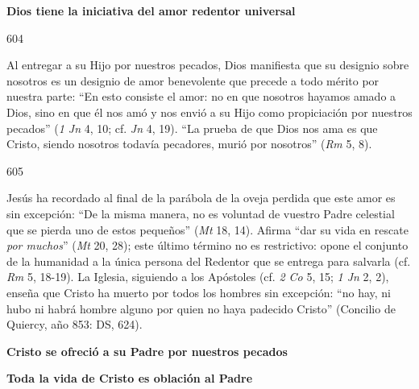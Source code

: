 			\begin{ccebody}\textbf{Dios tiene la iniciativa del amor redentor universal}\end{ccebody}
			
			\begin{ccebody}\begin{ccenumber}604\end{ccenumber} Al entregar a su Hijo por nuestros pecados, Dios manifiesta que su designio sobre nosotros es un designio de amor benevolente que precede a todo mérito por nuestra parte: “En esto consiste el amor: no en que nosotros hayamos amado a Dios, sino en que él nos amó y nos envió a su Hijo como propiciación por nuestros pecados” (\textit{1 Jn} 4, 10; cf. \textit{Jn} 4, 19). “La prueba de que Dios nos ama es que Cristo, siendo nosotros todavía pecadores, murió por nosotros” (\textit{Rm} 5, 8).\end{ccebody}
			
			\begin{ccebody}\begin{ccenumber}605\end{ccenumber} Jesús ha recordado al final de la parábola de la oveja perdida que este amor es sin excepción: “De la misma manera, no es voluntad de vuestro Padre celestial que se pierda uno de estos pequeños” (\textit{Mt} 18, 14). Afirma “dar su vida en rescate \textit{por muchos}” (\textit{Mt} 20, 28); este último término no es restrictivo: opone el conjunto de la humanidad a la única persona del Redentor que se entrega para salvarla (cf. \textit{Rm} 5, 18-19). La Iglesia, siguiendo a los Apóstoles (cf. \textit{2 Co} 5, 15; \textit{1 Jn} 2, 2), enseña que Cristo ha muerto por todos los hombres sin excepción: “no hay, ni hubo ni habrá hombre alguno por quien no haya padecido Cristo” (Concilio de Quiercy, año 853: DS, 624).\end{ccebody}
			
			\begin{ccebody}\textbf{Cristo se ofreció a su Padre por nuestros pecados}\end{ccebody}
			
			\begin{ccebody}\textbf{Toda la vida de Cristo es oblación al Padre}\end{ccebody}
			
